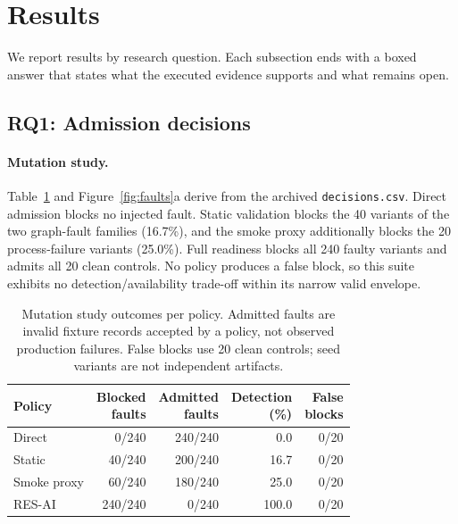 \documentclass[pdflatex,sn-mathphys-num]{sn-jnl}
\theoremstyle{thmstylethree}
\newcommand{\code}[1]{\texttt{#1}}
\newcommand{\MutationFaultCases}{240}
\newcommand{\MutationCleanCases}{20}
\newcommand{\StaticBlocked}{40}
\newcommand{\SmokeAdditional}{20}
\begin{document}


\section{Results}\label{sec:results}
We report results by research question. Each subsection ends with a boxed answer that states what the executed evidence supports and what remains open.

\subsection{RQ1: Admission decisions}\label{sec:rq1}
\paragraph{Mutation study.} Table~\ref{tab:local} and Figure~\ref{fig:faults}a derive from the archived \code{decisions.csv}. Direct admission blocks no injected fault. Static validation blocks the \StaticBlocked{} variants of the two graph-fault families (16.7\%), and the smoke proxy additionally blocks the \SmokeAdditional{} process-failure variants (25.0\%). Full readiness blocks all \MutationFaultCases{} faulty variants and admits all \MutationCleanCases{} clean controls. No policy produces a false block, so this suite exhibits no detection/availability trade-off within its narrow valid envelope.

\begin{table}[t]
\caption{Mutation study outcomes per policy. Admitted faults are invalid fixture records accepted by a policy, not observed production failures. False blocks use \MutationCleanCases{} clean controls; seed variants are not independent artifacts.}\label{tab:local}
\centering\small
\begin{tabular}{lrrrr}
\toprule Policy & \shortstack{Blocked\\faults} & \shortstack{Admitted\\faults} & \shortstack{Detection\\(\%)} & \shortstack{False\\blocks} \\
\midrule
Direct & 0/240 & 240/240 & 0.0 & 0/20 \\
Static & 40/240 & 200/240 & 16.7 & 0/20 \\
Smoke proxy & 60/240 & 180/240 & 25.0 & 0/20 \\
RES-AI & 240/240 & 0/240 & 100.0 & 0/20 \\
\bottomrule
\end{tabular}


\end{table}
\end{document}

